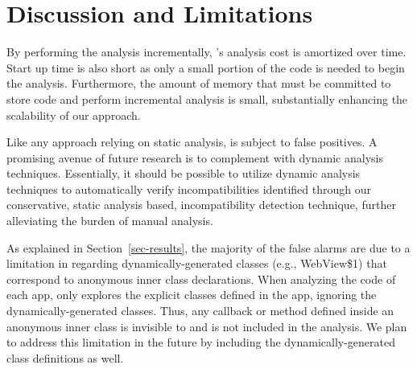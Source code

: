 \section{Discussion and Limitations}\label{sec-discussion}


By performing the analysis incrementally, \@approach's
analysis cost is amortized over time.  
Start up time is also short as only a small
portion of the code is needed to begin the analysis.
Furthermore, the amount of memory that must be committed to store code
and perform incremental analysis is small,
substantially enhancing the
scalability of our approach. 

Like any approach relying on static analysis, \@approach is subject
to false positives. A promising avenue of future research is
to complement \@approach with dynamic analysis techniques.
Essentially, it should be possible to utilize dynamic
analysis techniques to automatically verify
incompatibilities identified through our conservative,
static analysis based, incompatibility detection technique,
further alleviating the burden of manual analysis.

As explained in Section~\ref{sec-results}, the majority of the
false alarms are due to a limitation in \@approach regarding
dynamically-generated classes (e.g., {\sf WebView\$1}) that
correspond to anonymous inner class declarations.  When
analyzing the code of each app, \@approach only explores the
explicit classes defined in the app, ignoring the
dynamically-generated classes. Thus, any callback or method
defined inside an anonymous inner class is invisible to
\@approach and is not included in the analysis. We plan to
address this limitation in the future by including the
dynamically-generated class definitions as well.


